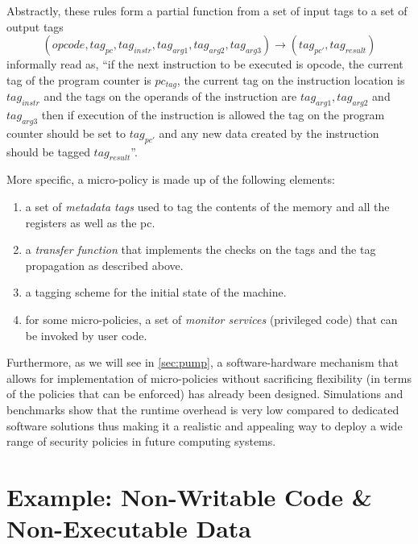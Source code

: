 Abstractly, these rules form a partial function from a set of
input tags to a set of output tags
$$(opcode, tag_{pc},tag_{instr}, tag_{arg1}, tag_{arg2}, tag_{arg3})
\rightarrow (tag_{pc'},tag_{result})$$
informally read as, ``if the next instruction to be executed is opcode, the
current tag of the program counter is $pc_{tag}$, the current tag on the
instruction location is $tag_{instr}$ and the tags on the operands of the
instruction are $tag_{arg1}, tag_{arg2}$ and $tag_{arg3}$ then if execution of
the instruction is allowed the tag on the program counter should be set
to $tag_{pc'}$ and any new data created by the instruction should be tagged
$tag_{result}$''.

More specific, a micro-policy is made up of the following elements:
\begin{enumerate}
\item a set of {\em metadata tags} used to tag the contents of the memory and
all the registers as well as the pc.
\item a {\em transfer function} that implements the checks on the tags and
the tag propagation as described above.
\item a tagging scheme for the initial state of the machine.
\item for some micro-policies, a set of {\em monitor services} (\IE privileged
code) that can be invoked by user code.
\end{enumerate}

Furthermore, as we will see in \cref{sec:pump}, a software-hardware
mechanism that allows for implementation of micro-policies without
sacrificing flexibility (in terms of the policies that can be
enforced) has already been designed. Simulations and benchmarks show
that the runtime overhead is very low compared to dedicated software
solutions thus making it a realistic and appealing way to deploy a
wide range of security policies in future computing systems.

\section{Example:
  Non-Writable Code \& Non-Executable Data}
\label{sec:nwc_nxd}



